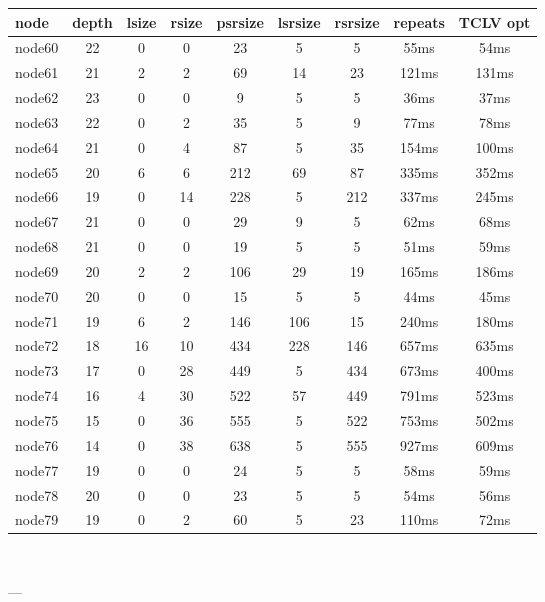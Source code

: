 \begin{tabular}{|l|c|c|c|c|c|c|c|c|}
\hline node & depth & lsize & rsize & psrsize & lsrsize & rsrsize   & repeats & TCLV opt\\
    \hline node60 & 22 & 0 & 0 & 23 & 5 & 5 & 55ms & 54ms\\
    \hline node61 & 21 & 2 & 2 & 69 & 14 & 23 & 121ms & 131ms\\
    \hline node62 & 23 & 0 & 0 & 9 & 5 & 5 & 36ms & 37ms\\
    \hline node63 & 22 & 0 & 2 & 35 & 5 & 9 & 77ms & 78ms\\
    \hline node64 & 21 & 0 & 4 & 87 & 5 & 35 & 154ms & 100ms\\
    \hline node65 & 20 & 6 & 6 & 212 & 69 & 87 & 335ms & 352ms\\
    \hline node66 & 19 & 0 & 14 & 228 & 5 & 212 & 337ms & 245ms\\
    \hline node67 & 21 & 0 & 0 & 29 & 9 & 5 & 62ms & 68ms\\
    \hline node68 & 21 & 0 & 0 & 19 & 5 & 5 & 51ms & 59ms\\
    \hline node69 & 20 & 2 & 2 & 106 & 29 & 19 & 165ms & 186ms\\
    \hline node70 & 20 & 0 & 0 & 15 & 5 & 5 & 44ms & 45ms\\
    \hline node71 & 19 & 6 & 2 & 146 & 106 & 15 & 240ms & 180ms\\
    \hline node72 & 18 & 16 & 10 & 434 & 228 & 146 & 657ms & 635ms\\
    \hline node73 & 17 & 0 & 28 & 449 & 5 & 434 & 673ms & 400ms\\
    \hline node74 & 16 & 4 & 30 & 522 & 57 & 449 & 791ms & 523ms\\
    \hline node75 & 15 & 0 & 36 & 555 & 5 & 522 & 753ms & 502ms\\
    \hline node76 & 14 & 0 & 38 & 638 & 5 & 555 & 927ms & 609ms\\
    \hline node77 & 19 & 0 & 0 & 24 & 5 & 5 & 58ms & 59ms\\
    \hline node78 & 20 & 0 & 0 & 23 & 5 & 5 & 54ms & 56ms\\
    \hline node79 & 19 & 0 & 2 & 60 & 5 & 23 & 110ms & 72ms\\

\hline
\end{tabular} \

---


